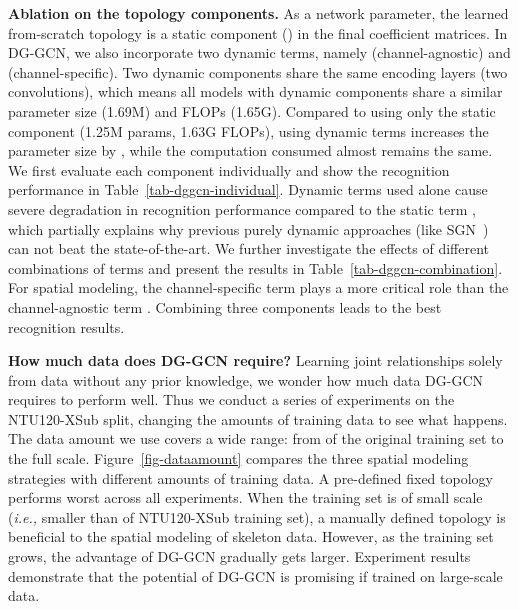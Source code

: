 \noindent
\textbf{Ablation on the topology components. }
As a network parameter, the learned from-scratch topology is a static component () in the final coefficient matrices. 
In DG-GCN, we also incorporate two dynamic terms, namely  (channel-agnostic) and  (channel-specific). 
Two dynamic components share the same encoding layers (two  convolutions), 
which means all models with dynamic components share a similar parameter size (1.69M) and FLOPs (1.65G). 
Compared to using only the static component (1.25M params, 1.63G FLOPs), 
using dynamic terms increases the parameter size by , while the computation consumed almost remains the same. 
We first evaluate each component individually and show the recognition performance in Table~\ref{tab-dggcn-individual}. 
Dynamic terms used alone cause severe degradation in recognition performance compared to the static term , 
which partially explains why previous purely dynamic approaches (like SGN~\cite{zhang2020semantics}) can not beat the state-of-the-art. 
We further investigate the effects of different combinations of terms and present the results in Table~\ref{tab-dggcn-combination}. 
For spatial modeling, the channel-specific term  plays a more critical role than the channel-agnostic term . 
Combining three components leads to the best recognition results.

\noindent
\textbf{How much data does DG-GCN require? }  
Learning joint relationships solely from data without any prior knowledge, 
we wonder how much data DG-GCN requires to perform well. 
Thus we conduct a series of experiments on the NTU120-XSub split, changing the amounts of training data to see what happens. 
The data amount we use covers a wide range: from  of the original training set to the full scale. 
Figure~\ref{fig-dataamount} compares the three spatial modeling strategies with different amounts of training data.  
A pre-defined fixed topology performs worst across all experiments. 
When the training set is of small scale (\emph{i.e.,} smaller than  of NTU120-XSub training set), 
a manually defined topology is beneficial to the spatial modeling of skeleton data.
However, as the training set grows, the advantage of DG-GCN gradually gets larger. 
Experiment results demonstrate that the potential of DG-GCN is promising if trained on large-scale data. 

